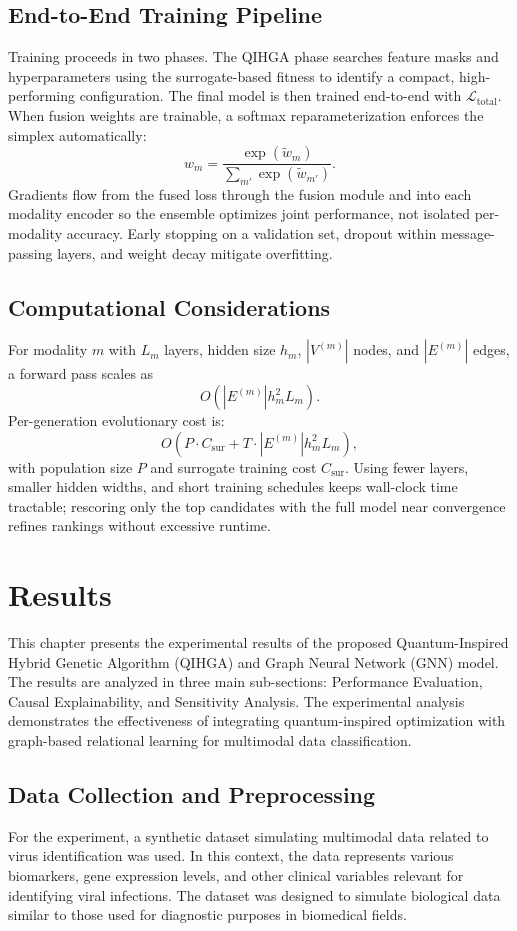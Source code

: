 \documentclass[11pt,a4paper]{article}
\begin{document}
\subsection{End-to-End Training Pipeline}
Training proceeds in two phases. The QIHGA phase searches feature masks and hyperparameters using the surrogate-based fitness to identify a compact, high-performing configuration. The final model is then trained end-to-end with $\mathcal{L}_\text{total}$. When fusion weights are trainable, a softmax reparameterization enforces the simplex automatically:
\[
w_m = \frac{\exp(\tilde{w}_m)}{\sum_{m'} \exp(\tilde{w}_{m'})}.
\]
Gradients flow from the fused loss through the fusion module and into each modality encoder so the ensemble optimizes joint performance, not isolated per-modality accuracy. Early stopping on a validation set, dropout within message-passing layers, and weight decay mitigate overfitting.

\subsection{Computational Considerations}
For modality $m$ with $L_m$ layers, hidden size $h_m$, $|V^{(m)}|$ nodes, and $|E^{(m)}|$ edges, a forward pass scales as
\[
O(|E^{(m)}| h_m^2 L_m).
\]
Per-generation evolutionary cost is:
\[
O(P \cdot C_\text{sur} + T \cdot |E^{(m)}| h_m^2 L_m),
\]
with population size $P$ and surrogate training cost $C_\text{sur}$. Using fewer layers, smaller hidden widths, and short training schedules keeps wall-clock time tractable; rescoring only the top candidates with the full model near convergence refines rankings without excessive runtime.

\section{Results}
This chapter presents the experimental results of the proposed Quantum-Inspired Hybrid Genetic Algorithm (QIHGA) and Graph Neural Network (GNN) model. The results are analyzed in three main sub-sections: Performance Evaluation, Causal Explainability, and Sensitivity Analysis. The experimental analysis demonstrates the effectiveness of integrating quantum-inspired optimization with graph-based relational learning for multimodal data classification.

\subsection{Data Collection and Preprocessing}
For the experiment, a synthetic dataset simulating multimodal data related to virus identification was used. In this context, the data represents various biomarkers, gene expression levels, and other clinical variables relevant for identifying viral infections. The dataset was designed to simulate biological data similar to those used for diagnostic purposes in biomedical fields.
\end{document}
